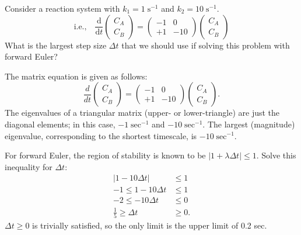 \begin{exercise} %
    Consider a reaction system  with $k_1 = 1\;\mathrm{s}^{-1}$ and $k_2 = 10\;\mathrm{s}^{-1}$.
    \[
        \text{i.e.,}\quad \frac{\textrm{d}}{\textrm{d}t} \begin{pmatrix} C_A \\ C_B \end{pmatrix}
        = \begin{pmatrix} -1 & 0 \\ +1 & -10 \end{pmatrix}
        \begin{pmatrix} C_A \\ C_B \end{pmatrix}
        \]
    What is the largest step size $\Delta t$ that we should use if solving this problem with forward Euler?
\end{exercise}

\begin{solution}
    The matrix equation is given as follows:
    \[
        \frac{d}{dt}
        \begin{pmatrix}C_A\\C_B\end{pmatrix}
        =
        \begin{pmatrix}-1 & 0\\+1 & -10\end{pmatrix}
        \begin{pmatrix}C_A\\C_B\end{pmatrix}.
    \]
    The eigenvalues of a triangular matrix (upper- or lower-triangle) are just the diagonal elements; in this case, $-1\;\mathrm{sec}^{-1}$ and $-10\;\mathrm{sec}^{-1}$. The largest (magnitude) eigenvalue, corresponding to the shortest timescale, is $-10\;\mathrm{sec}^{-1}$.

    For forward Euler, the region of stability is known to be $|1+\lambda\Delta t|\le 1$. Solve this inequality for \(\Delta t\):
    \begin{align*}
         |1 - 10\Delta t| &\le 1\\
        -1 \le 1 - 10\Delta t &\le 1\\
        -2 \le -10\Delta t &\le 0\\
        \frac{1}{5} \ge \Delta t &\ge 0.
    \end{align*}
    \(\Delta t \ge 0\) is trivially satisfied, so the only limit is the upper limit of 0.2 sec.
\end{solution}

